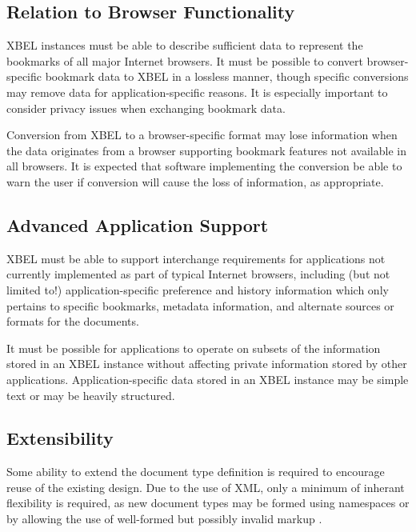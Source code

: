 \documentclass{howto}
\begin{document}
  \subsection{Relation to Browser Functionality
              \label{req-browser}}

    XBEL instances must be able to describe sufficient data to
    represent the bookmarks of all major Internet browsers.
    It must be possible to convert browser-specific bookmark data to
    XBEL in a lossless manner, though specific conversions may remove
    data for application-specific reasons.  It is especially important
    to consider privacy issues when exchanging bookmark data.

    Conversion from XBEL to a browser-specific format may lose
    information when the data originates from a browser supporting
    bookmark features not available in all browsers.  It is expected
    that software implementing the conversion be able to warn the user
    if conversion will cause the loss of information, as appropriate.

  \subsection{Advanced Application Support
              \label{req-applications}}

    XBEL must be able to support interchange requirements for
    applications not currently implemented as part of typical Internet
    browsers, including (but not limited to!) application-specific
    preference and history information which only pertains to specific
    bookmarks, metadata information, and alternate sources or formats
    for the documents.

    It must be possible for applications to operate on subsets of the
    information stored in an XBEL instance without affecting private
    information stored by other applications.  Application-specific
    data stored in an XBEL instance may be simple text or may be
    heavily structured.

  \subsection{Extensibility
              \label{req-extensibility}}

    Some ability to extend the document type definition is required to 
    encourage reuse of the existing design.  Due to the use of XML,
    only a minimum of inherant flexibility is required, as new
    document types may be formed using namespaces or by allowing the
    use of well-formed but possibly invalid markup \cite{w3c-xml-names}.
\end{document}
